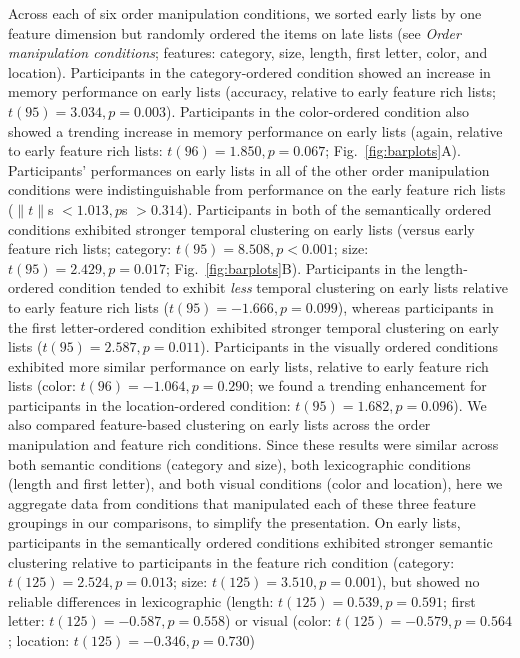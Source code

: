 \documentclass[11pt]{article}
\begin{document}
Across each of six order manipulation conditions, we sorted early lists by one
feature dimension but randomly ordered the items on late lists (see
\textit{Order manipulation conditions}; features: category, size, length, first
letter, color, and location). Participants in the category-ordered condition
showed an increase in memory performance on early lists (accuracy, relative to
early feature rich lists; $t(95) = 3.034, p = 0.003$). Participants in the
color-ordered condition also showed a trending increase in memory performance
on early lists (again, relative to early feature rich lists: $t(96) = 1.850, p
= 0.067$; Fig.~\ref{fig:barplots}A). Participants' performances on early lists
in all of the other order manipulation conditions were indistinguishable from
performance on the early feature rich lists ($\|t\|$s $< 1.013, p$s $> 0.314$).
Participants in both of the semantically ordered conditions exhibited stronger
temporal clustering on early lists (versus early feature rich lists; category:
$t(95) = 8.508, p < 0.001$; size: $t(95) = 2.429, p = 0.017$;
Fig.~\ref{fig:barplots}B). Participants in the length-ordered condition tended
to exhibit \textit{less} temporal clustering on early lists relative to early
feature rich lists ($t(95) = -1.666, p = 0.099$), whereas participants in the
first letter-ordered condition exhibited stronger temporal clustering on early
lists ($t(95) = 2.587, p = 0.011$). Participants in the visually ordered
conditions exhibited more similar performance on early lists, relative to early
feature rich lists (color: $t(96) = -1.064, p = 0.290$; we found a trending
enhancement for participants in the location-ordered condition: $t(95) = 1.682,
p = 0.096$). We also compared feature-based clustering on early lists across
the order manipulation and feature rich conditions. Since these results were
similar across both semantic conditions (category and size), both lexicographic
conditions (length and first letter), and both visual conditions (color and
location), here we aggregate data from conditions that manipulated each of
these three feature groupings in our comparisons, to simplify the presentation.
On early lists, participants in the semantically ordered conditions exhibited
stronger semantic clustering relative to participants in the feature rich
condition (category: $t(125) = 2.524, p = 0.013$; size: $t(125) = 3.510, p =
0.001$), but showed no reliable differences in lexicographic (length: $t(125) =
0.539, p = 0.591$; first letter: $t(125) = -0.587, p = 0.558$) or visual
(color: $t(125) = -0.579, p = 0.564$; location: $t(125) = -0.346, p = 0.730$)
\end{document}
